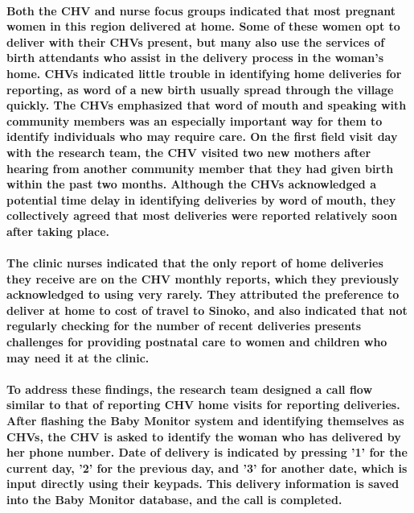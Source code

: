 \paragraph{Both the CHV and nurse focus groups indicated that most pregnant women in this region delivered at home. Some of these women opt to deliver with their CHVs present, but many also use the services of birth attendants who assist in the delivery process in the woman's home. CHVs indicated little trouble in identifying home deliveries for reporting, as word of a new birth usually spread through the village quickly. The CHVs emphasized that word of mouth and speaking with community members was an especially important way for them to identify individuals who may require care. On the first field visit day with the research team, the CHV visited two new mothers after hearing from another community member that they had given birth within the past two months. Although the CHVs acknowledged a potential time delay in identifying deliveries by word of mouth, they collectively agreed that most deliveries were reported relatively soon after taking place.} 

\paragraph{The clinic nurses indicated that the only report of home deliveries they receive are on the CHV monthly reports, which they previously acknowledged to using very rarely. They attributed the preference to deliver at home to cost of travel to Sinoko, and also indicated that not regularly checking for the number of recent deliveries presents challenges for providing postnatal care to women and children who may need it at the clinic.}

\paragraph{To address these findings, the research team designed a call flow similar to that of reporting CHV home visits for reporting deliveries. After flashing the Baby Monitor system and identifying themselves as CHVs, the CHV is asked to identify the woman who has delivered by her phone number. Date of delivery is indicated by pressing '1' for the current day, '2' for the previous day, and '3' for another date, which is input directly using their keypads. This delivery information is saved into the Baby Monitor database, and the call is completed.}



